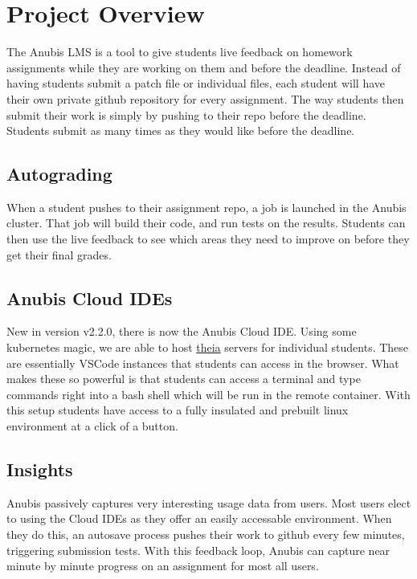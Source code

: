 \chapter{Project Overview}\label{ch:overview}

The Anubis LMS is a tool to give students live feedback on homework
assignments while they are working on them and before the deadline.
Instead of having students submit a patch file or individual files, each student
will have their own private github repository for every assignment.
The way students then submit their work is simply by pushing to their repo before
the deadline.
Students submit as many times as they would like before the deadline.

\section{Autograding}\label{sec:autograding}

When a student pushes to their assignment repo, a job is launched in the
Anubis cluster. That job will build their code, and run tests on the results.
Students can then use the live feedback to see which areas they need to improve on
before they get their final grades.


\section{Anubis Cloud IDEs}\label{sec:anubis-cloud-ides}

New in version v2.2.0, there is now the Anubis Cloud IDE. Using some kubernetes magic, we are able to
host \href{https://theia-ide.org/}{theia} servers for individual students. These are essentially VSCode instances
that students can access in the browser. What makes these so powerful is that students can access a terminal
and type commands right into a bash shell which will be run in the remote container. With this setup students
have access to a fully insulated and prebuilt linux environment at a click of a button.


\section{Insights}\label{sec:insights}

Anubis passively captures very interesting usage data from users.
Most users elect to using the Cloud IDEs as they offer an easily accessable environment.
When they do this, an autosave process pushes their work to github every few minutes,
triggering submission tests.
With this feedback loop, Anubis can capture near minute by minute progress on an assignment
for most all users.
